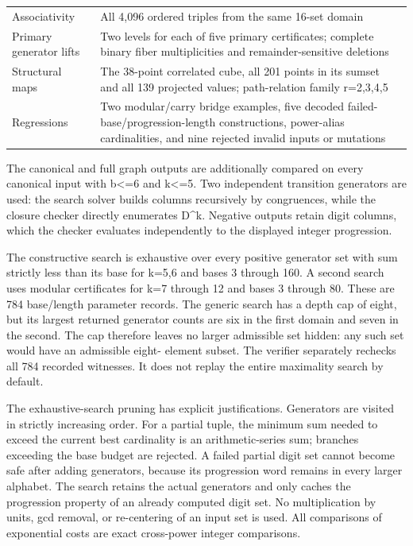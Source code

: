 \begin{longtable}[]{@{}
  >{\raggedright\arraybackslash}p{}
  >{\raggedright\arraybackslash}p{}@{}}
Associativity & All 4,096 ordered triples from the same 16-set domain \\
Primary generator lifts & Two levels for each of five primary certificates; complete binary fiber multiplicities and remainder-sensitive deletions \\
Structural maps & The 38-point correlated cube, all 201 points in its sumset and all 139 projected values; path-relation family r=2,3,4,5 \\
Regressions & Two modular/carry bridge examples, five decoded failed-base/progression-length constructions, power-alias cardinalities, and nine rejected invalid inputs or mutations \\
\end{longtable}

The canonical and full graph outputs are additionally compared on every canonical input with b\textless=6 and k\textless=5. Two independent transition generators are used: the search solver builds columns recursively by congruences, while the closure checker directly enumerates D\^{}k. Negative outputs retain digit columns, which the checker evaluates independently to the displayed integer progression.

The constructive search is exhaustive over every positive generator set with sum strictly less than its base for k=5,6 and bases 3 through 160. A second search uses modular certificates for k=7 through 12 and bases 3 through 80. These are 784 base/length parameter records. The generic search has a depth cap of eight, but its largest returned generator counts are six in the first domain and seven in the second. The cap therefore leaves no larger admissible set hidden: any such set would have an admissible eight- element subset. The verifier separately rechecks all 784 recorded witnesses. It does not replay the entire maximality search by default.

The exhaustive-search pruning has explicit justifications. Generators are visited in strictly increasing order. For a partial tuple, the minimum sum needed to exceed the current best cardinality is an arithmetic-series sum; branches exceeding the base budget are rejected. A failed partial digit set cannot become safe after adding generators, because its progression word remains in every larger alphabet. The search retains the actual generators and only caches the progression property of an already computed digit set. No multiplication by units, gcd removal, or re-centering of an input set is used. All comparisons of exponential costs are exact cross-power integer comparisons.

